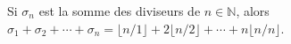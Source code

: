 Si $\sigma_n$ est la somme des diviseurs de $n \in \mathbb{N}$, alors $\sigma_1 + \sigma_2 + \cdots + \sigma_n = \lfloor n/1 \rfloor + 2\lfloor n/2 \rfloor + \cdots + n\lfloor n/n \rfloor$.
